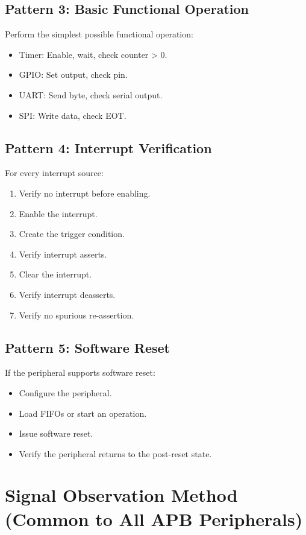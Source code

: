 \subsection{Pattern 3: Basic Functional Operation}

Perform the simplest possible functional operation:
\begin{itemize}[leftmargin=2em]
  \item Timer: Enable, wait, check counter > 0.
  \item GPIO: Set output, check pin.
  \item UART: Send byte, check serial output.
  \item SPI: Write data, check EOT.
\end{itemize}

\subsection{Pattern 4: Interrupt Verification}

For every interrupt source:
\begin{enumerate}[leftmargin=2em]
  \item Verify no interrupt before enabling.
  \item Enable the interrupt.
  \item Create the trigger condition.
  \item Verify interrupt asserts.
  \item Clear the interrupt.
  \item Verify interrupt deasserts.
  \item Verify no spurious re-assertion.
\end{enumerate}

\subsection{Pattern 5: Software Reset}

If the peripheral supports software reset:
\begin{itemize}[leftmargin=2em]
  \item Configure the peripheral.
  \item Load FIFOs or start an operation.
  \item Issue software reset.
  \item Verify the peripheral returns to the post-reset state.
\end{itemize}

\section{Signal Observation Method (Common to All APB Peripherals)}

